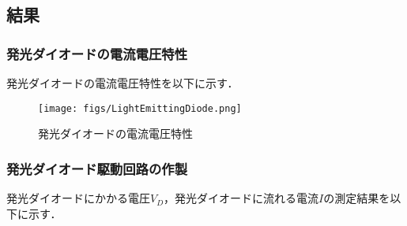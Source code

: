 \documentclass{ltjsarticle}
\begin{document}
\subsection{結果}
\subsubsection{発光ダイオードの電流電圧特性}
発光ダイオードの電流電圧特性を以下に示す．
\begin{figure}[H]
  \begin{center}
    \texttt{[image: figs/LightEmittingDiode.png]}
    \caption{発光ダイオードの電流電圧特性}
  \end{center}
\end{figure}

\subsubsection{発光ダイオード駆動回路の作製}
発光ダイオードにかかる電圧${V_D}$，発光ダイオードに流れる電流${I}$の測定結果を以下に示す．
\end{document}
